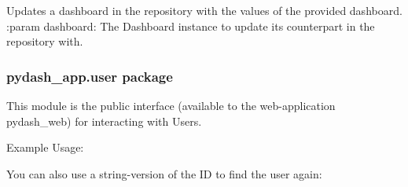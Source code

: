 \documentclass[letterpaper,10pt,english]{sphinxmanual}
\begin{document}

\begin{fulllineitems}
\label{\detokenize{pydash_app.dashboard.repository:pydash_app.dashboard.repository.update}}
Updates a dashboard in the repository with the values of the provided dashboard.
:param dashboard: The Dashboard instance to update its counterpart in the repository with.

\end{fulllineitems}



\subsubsection{pydash\_app.user package}
\label{\detokenize{pydash_app.user:module-pydash_app.user}}\label{\detokenize{pydash_app.user:pydash-app-user-package}}\label{\detokenize{pydash_app.user::doc}}
This module is the public interface (available to the web-application pydash\_web)
for interacting with Users.

Example Usage:

%
\begin{sphinxVerbatim}[commandchars=\\\{\}]
    
  
  
\end{sphinxVerbatim}

You can also use a string-version of the ID to find the user again:

%
\begin{sphinxVerbatim}[commandchars=\\\{\}]
  
  
\end{sphinxVerbatim}
\end{document}
